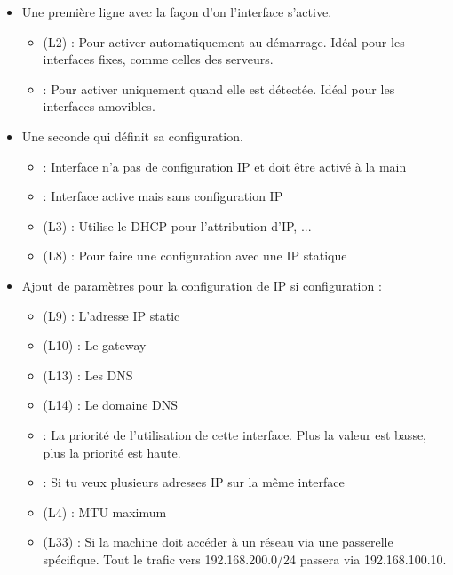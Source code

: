 \documentclass{article}
\begin{document}
\begin{itemize}
    \item Une première ligne avec la façon d’on l’interface s’active.
    \begin{itemize}
        \item (L2)   : Pour activer automatiquement au démarrage. Idéal pour les interfaces fixes, comme celles des serveurs.
        \item {} : Pour activer uniquement quand elle est détectée. Idéal pour les interfaces amovibles.
    \end{itemize}
    \item Une seconde qui définit sa configuration.
    \begin{itemize}
        \item {} : Interface n'a pas de configuration IP et doit être activé à la main
        \item {} : Interface active mais sans configuration IP
        \item (L3)  : Utilise le DHCP pour l'attribution d'IP, ...
        \item (L8)  : Pour faire une configuration avec une IP statique
    \end{itemize}
    \item Ajout de paramètres pour la configuration de IP si configuration  :
    \begin{itemize}
        \item (L9)  : L'adresse IP static
        \item (L10)  : Le gateway
        \item (L13)  : Les DNS
        \item (L14)  : Le domaine DNS
        \item {} : La priorité de l'utilisation de cette interface. Plus la valeur est basse, plus la priorité est haute.
        \item {} : Si tu veux plusieurs adresses IP sur la même interface
        \item (L4)  : MTU maximum
        \item (L33)  : Si la machine doit accéder à un réseau via une passerelle spécifique. Tout le trafic vers 192.168.200.0/24 passera via 192.168.100.10.
    \end{itemize}
\end{itemize}
\end{document}
